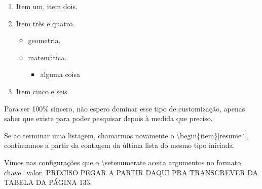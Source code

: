 
\begin{enumerate}
\item Item um, item dois.
\item Item três e quatro.
\begin{itemize}
\item geometria.
\item matemática.
	\begin{itemize}
		\item alguma coisa
	\end{itemize}
\end{itemize}
\item Item cinco e seis.
\end{enumerate}

Para ser 100\% sincero, não espero dominar esse tipo de customização, apenas
saber que existe para poder pesquisar depois à medida que preciso.

Se ao terminar uma listagem, chamarmos novamente o \textbackslash begin\{item\}[resume*], continuamos a partir da contagem da última lista do mesmo tipo iniciada.

Vimos nas configurações que o \textbackslash setenumerate aceita argumentos no formato chave=valor. 
PRECISO PEGAR A PARTIR DAQUI PRA TRANSCREVER DA TABELA DA PÁGINA 133.

\newpage
